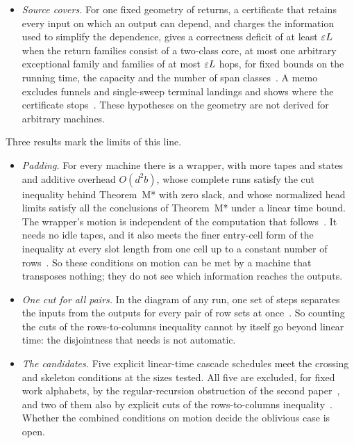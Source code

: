 \begin{itemize}[leftmargin=1.5em]
the coding~\cite[Lemma~7.1]{SixteenthPaper2026}. When the cuts for different address bits are disjoint this gives a
time bound $\Omega(L\log d)$ that no coding can evade~\cite[Corollary~7.3]{SixteenthPaper2026}.
\item \emph{Source covers.} For one fixed geometry of returns, a certificate that retains every input on which an
output can depend, and charges the information used to simplify the dependence, gives a correctness deficit of at
least $\varepsilon L$ when the return families consist of a two-class core, at most one arbitrary exceptional family and
families of at most $\varepsilon L$ hops, for fixed bounds on the running time, the capacity and the number of span
classes~\cite[Corollary~4.3]{SourceCovers2026}. A memo excludes funnels and single-sweep terminal landings and shows
where the certificate stops~\cite{GapAreaMemo2026}. These hypotheses on the geometry are not derived for arbitrary
machines.
\end{itemize}

Three results mark the limits of this line.
\begin{itemize}[leftmargin=1.5em]
\item \emph{Padding.} For every machine there is a wrapper, with more tapes and states and additive overhead
$O(d^2b)$, whose complete runs satisfy the cut inequality behind Theorem~M* with zero slack, and whose normalized head
limits satisfy all the conclusions of Theorem~M* under a linear time bound. The wrapper's motion is independent of the
computation that follows~\cite[Theorem~8.1]{SecondPaper2026}. It needs no idle tapes, and it also meets the finer
entry-cell form of the inequality at every slot length from one cell up to a constant number of
rows~\cite{PaddingMemo2026}. So these conditions on motion can be met by a machine that transposes nothing; they do not
see which information reaches the outputs.
\item \emph{One cut for all pairs.} In the diagram of any run, one set of steps separates the inputs from the outputs
for every pair of row sets at once~\cite[Proposition~10.2]{SixteenthPaper2026}. So counting the cuts of the
rows-to-columns inequality cannot by itself go beyond linear time: the disjointness that
\cite[Corollary~7.3]{SixteenthPaper2026} needs is not automatic.
\item \emph{The candidates.} Five explicit linear-time cascade schedules meet the crossing and skeleton conditions
at the sizes tested. All five are excluded, for fixed work alphabets, by the regular-recursion obstruction of the second
paper~\cite{CascadeObstructionMemo2026}, and two of them also by explicit cuts of the rows-to-columns
inequality~\cite[Theorem~10.8]{SixteenthPaper2026}. Whether the combined conditions on motion decide the oblivious case
is open.
\end{itemize}


